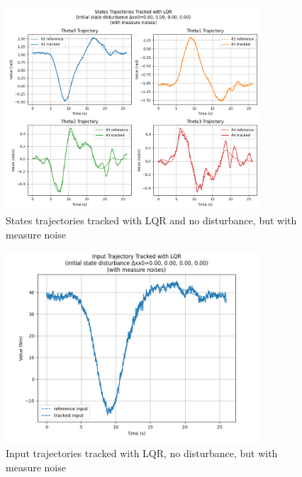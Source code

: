 \documentclass[a4paper,11pt,oneside]{book}
\begin{document}
\begin{figure}[H]
    \centering
    \includegraphics[width=0.85\textwidth]{LQR_mn_T3.png}
    \caption{States trajectories tracked with LQR and no disturbance, but with measure noise}
    \label{fig:enter-label}
\end{figure}
\begin{figure}[H]
    \centering
    \includegraphics[width=0.85\textwidth]{Input_Trajectory_Tracked_with_LQR_mn_T3.png}
    \caption{Input trajectories tracked with LQR, no disturbance, but with measure noise}
    \label{fig:enter-label}
\end{figure}

\clearpage
\end{document}
